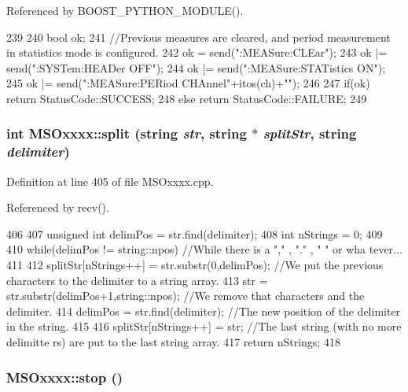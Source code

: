 Referenced by BOOST\_\-PYTHON\_\-MODULE().


\begin{DoxyCode}
239 {   
240     bool ok;
241     //Previous measures are cleared, and period measurement in statistics mode is
       configured.
242     ok  = send(":MEASure:CLEar\n");
243     ok |= send(":SYSTem:HEADer OFF\n");    
244     ok |= send(":MEASure:STATistics ON\n");
245     ok |= send(":MEASure:PERiod CHAnnel"+itos(ch)+"\n");
246 
247     if(ok)  return StatusCode::SUCCESS;
248     else        return StatusCode::FAILURE; 
249 }
\end{DoxyCode}
\hypertarget{classMSOxxxx_a46726c6d181a758bb4f598c66f336236}{
\subsubsection[{split}]{\setlength{\rightskip}{0pt plus 5cm}int MSOxxxx::split (string {\em str}, \/  string $\ast$ {\em splitStr}, \/  string {\em delimiter})}}
\label{classMSOxxxx_a46726c6d181a758bb4f598c66f336236}


Definition at line 405 of file MSOxxxx.cpp.

Referenced by recv().


\begin{DoxyCode}
406 {
407     unsigned int delimPos = str.find(delimiter);
408     int nStrings = 0;
409 
410     while(delimPos != string::npos)     //While there is a "," , "." , " " or wha
      tever...
411     {
412         splitStr[nStrings++] = str.substr(0,delimPos);      //We put the previous
       characters to the delimiter to a string array.
413         str = str.substr(delimPos+1,string::npos);              //We remove that 
      characters and the delimiter.
414         delimPos = str.find(delimiter);                                     //The
       new position of the delimiter in the string.
415     }
416     splitStr[nStrings++] = str;         //The last string (with no more delimitte
      rs) are put to the last string array.
417     return nStrings;
418 }
\end{DoxyCode}
\hypertarget{classMSOxxxx_a4ec991c3850a652fbe9a1709cab7001b}{
\subsubsection[{stop}]{ MSOxxxx::stop ()}}
\label{classMSOxxxx_a4ec991c3850a652fbe9a1709cab7001b}


